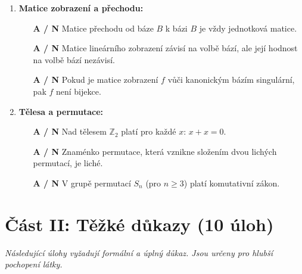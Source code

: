 \documentclass[a4paper,11pt]{article}
\begin{document}
\begin{enumerate}
    \item \textbf{Matice zobrazení a přechodu:} 
    \begin{itemize}
        \item[\textbf{A / N}] Matice přechodu od báze $B$ k bázi $B$ je vždy jednotková matice.
        \item[\textbf{A / N}] Matice lineárního zobrazení závisí na volbě bází, ale její hodnost na volbě bází nezávisí.
        \item[\textbf{A / N}] Pokud je matice zobrazení $f$ vůči kanonickým bázím singulární, pak $f$ není bijekce.
    \end{itemize}

    \item \textbf{Tělesa a permutace:} 
    \begin{itemize}
        \item[\textbf{A / N}] Nad tělesem $\mathbb{Z}_2$ platí pro každé $x$: $x + x = 0$.
        \item[\textbf{A / N}] Znaménko permutace, která vznikne složením dvou lichých permutací, je liché.
        \item[\textbf{A / N}] V grupě permutací $S_n$ (pro $n \ge 3$) platí komutativní zákon.
    \end{itemize}
\end{enumerate}

\newpage

\section*{Část II: Těžké důkazy (10 úloh)}
\textit{Následující úlohy vyžadují formální a úplný důkaz. Jsou určeny pro hlubší pochopení látky.}
\end{document}
